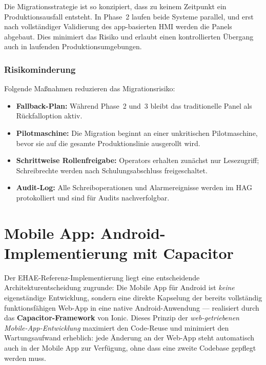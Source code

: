 ﻿\documentclass[12pt,a4paper]{article}
\begin{document}
Die Migrationsstrategie ist so konzipiert, dass zu keinem Zeitpunkt ein Produktionsausfall
entsteht. In Phase~2 laufen beide Systeme parallel, und erst nach vollständiger Validierung
des app-basierten HMI werden die Panels abgebaut. Dies minimiert das Risiko und erlaubt
einen kontrollierten Übergang auch in laufenden Produktionsumgebungen.

\subsubsection{Risikominderung}

Folgende Ma\ss{}nahmen reduzieren das Migrationsrisiko:

\begin{itemize}[leftmargin=2em]
  \item \textbf{Fallback-Plan:} Während Phase~2 und~3 bleibt das traditionelle Panel als
    Rückfalloption aktiv.
  \item \textbf{Pilotmaschine:} Die Migration beginnt an einer unkritischen Pilotmaschine,
    bevor sie auf die gesamte Produktionslinie ausgerollt wird.
  \item \textbf{Schrittweise Rollenfreigabe:} Operators erhalten zunächst nur
    Lesezugriff; Schreibrechte werden nach Schulungsabschluss freigeschaltet.
  \item \textbf{Audit-Log:} Alle Schreiboperationen und Alarmereignisse werden im HAG
    protokolliert und sind für Audits nachverfolgbar.
\end{itemize}

\section{Mobile App: Android-Implementierung mit Capacitor}
\label{sec:mobile}

Der EHAE-Referenz-Implementierung liegt eine entscheidende Architekturentscheidung
zugrunde: Die Mobile App für Android ist \emph{keine} eigenständige Entwicklung,
sondern eine direkte Kapselung der bereits vollständig funktionsfähigen Web-App in eine
native Android-Anwendung --- realisiert durch das \textbf{Capacitor-Framework}
\cite{capacitor} von Ionic. Dieses Prinzip der \emph{web-getriebenen
Mobile-App-Entwicklung} maximiert den Code-Reuse und minimiert den Wartungsaufwand
erheblich: jede Änderung an der Web-App steht automatisch auch in der Mobile App zur
Verfügung, ohne dass eine zweite Codebase gepflegt werden muss.
\end{document}
